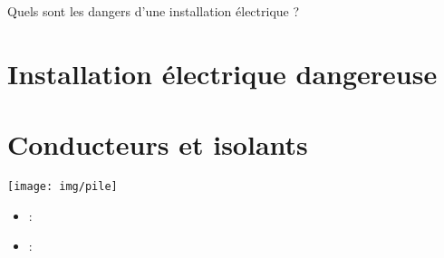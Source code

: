 \documentclass[12pt,a4paper]{article}
\date{}
\title{}
\begin{document}
	
\graphicspath{{./img/}}	



\begin{mypb}
	\begin{center}
		{\Large Quels sont les dangers d'une installation électrique ?}
	\end{center}
\end{mypb}


\section{Installation électrique dangereuse}










\section{Conducteurs et isolants}





\begin{center}
	\texttt{[image: img/pile]}
\end{center}
\begin{myexos}
	\begin{itemize}
		\item {} : 
		\item {} :
		
	\end{itemize}
\end{myexos}
\appendix

\end{document}
